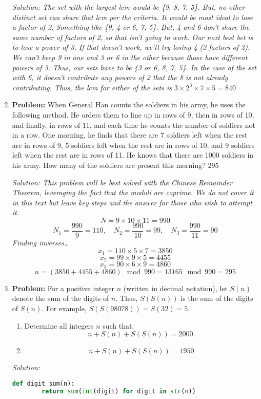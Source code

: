 \documentclass{article}
\begin{document}
\begin{enumerate}
    \textit{Solution: The set with the largest lcm would be \{9, 8, 7, 5\}. But, no other distinct set can share that lcm per the criteria. It would be most ideal to lose a factor of 2. Something like \{9, 4 or 6, 7, 5\}. But, 4 and 6 don't share the same number of factors of 2, so that isn't going to work. Our next best bet is to lose a power of 3. If that doesn't work, we'll try losing 4 (2 factors of 2). We can't keep 9 in one and 3 or 6 in the other because those have different powers of 3. Thus, our sets have to be \{3 or 6, 8, 7, 5\}. In the case of the set with 6, it doesn't contribute any powers of 2 that the 8 is not already contributing. Thus, the lcm for either of the sets is $3\times2^3\times7\times5 = 840$  }

    \item \textbf{Problem:}
    When General Han counts the soldiers in his army, he uses the following method. He orders them to line up in rows of 9, then in rows of 10, and finally, in rows of 11, and each time he counts the number of soldiers not in a row. One morning, he finds that there are 7 soldiers left when the rest are in rows of 9, 5 soldiers left when the rest are in rows of 10, and 9 soldiers left when the rest are in rows of 11. He knows that there are 1000 soldiers in his army. How many of the soldiers are present this morning? $295$

    \textit{Solution: This problem will be best solved with the Chinese Remainder Theorem, leveraging the fact that the moduli are coprime. We do not cover it in this text but leave key steps and the answer for those who wish to attempt it. 
    $$N = 9 \times 10 \times 11 = 990$$
    $$N_1 = \frac{990}{9} = 110, \quad N_2 = \frac{990}{10} = 99, \quad N_3 = \frac{990}{11} = 90$$
    Finding inverses\ldots
    $$x_1 = 110 \times 5 \times 7 = 3850$$
    $$x_2 = 99 \times 9 \times 5 = 4455$$
    $$x_3 = 90 \times 6 \times 9 = 4860$$
    $$n = (3850 + 4455 + 4860) \mod 990 = 13165 \mod 990 = 295$$ }
    
    \item \textbf{Problem:}
    For a positive integer \( n \) (written in decimal notation), let \( S(n) \) denote the sum of the digits of \( n \). Thus, \( S(S(n)) \) is the sum of the digits of \( S(n) \). For example, \( S(S(98078)) = S(32) = 5 \).

    \begin{enumerate} 
    \item Determine all integers \( n \) such that:
\[
n + S(n) + S(S(n)) = 2000.
\]
    \item $$n + S(n) + S(S(n)) = 1950$$
    \end{enumerate}
    \textit{Solution: }
    \begin{lstlisting}[language=Python]
    def digit_sum(n):
        return sum(int(digit) for digit in str(n))


\end{lstlisting}
\end{enumerate}
\end{document}
